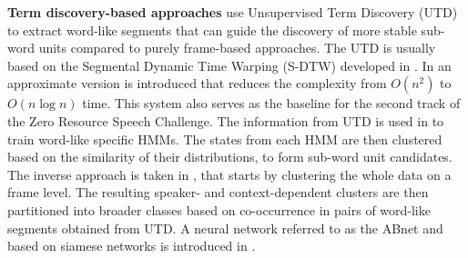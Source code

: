 \textbf{Term discovery-based approaches} %
 use Unsupervised Term Discovery (UTD) to extract word-like segments that can guide the discovery of more stable sub-word units compared to purely frame-based approaches.
The UTD is usually based on the Segmental Dynamic Time Warping (S-DTW) developed in \parencite{park2008unsupervised}.
In \parencite{jansen2011efficient} an approximate version is introduced that reduces the complexity from $O(n^2)$ to $O(n \log n)$ time.
This system also serves as the baseline for the second track of the Zero Resource Speech Challenge. %
The information from UTD is used in \parencite{jansen2011towards} to train word-like specific HMMs.
The states from each HMM are then clustered based on the similarity of their distributions, to form sub-word unit candidates.
The inverse approach is taken in \parencite{jansen2013weak}, that starts by clustering the whole data on a frame level. %
The resulting speaker- and context-dependent clusters are then partitioned into broader classes based on co-occurrence in pairs of word-like segments obtained from UTD. %
A neural network referred to as the ABnet and based on siamese networks \parencite{bromley1994signature} is introduced in \parencite{synnaeve2014phonetics}.
